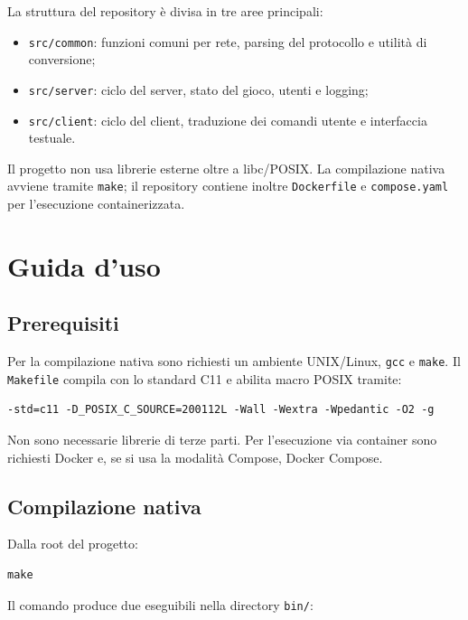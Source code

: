 \documentclass[11pt,a4paper]{article}
\begin{document}
La struttura del repository è divisa in tre aree principali:

\begin{itemize}
    \item \texttt{src/common}: funzioni comuni per rete, parsing del protocollo
    e utilità di conversione;
    \item \texttt{src/server}: ciclo del server, stato del gioco, utenti e
    logging;
    \item \texttt{src/client}: ciclo del client, traduzione dei comandi utente e
    interfaccia testuale.
\end{itemize}

Il progetto non usa librerie esterne oltre a libc/POSIX. La compilazione nativa
avviene tramite \texttt{make}; il repository contiene inoltre \texttt{Dockerfile}
e \texttt{compose.yaml} per l'esecuzione containerizzata.

\section{Guida d'uso}

\subsection{Prerequisiti}

Per la compilazione nativa sono richiesti un ambiente UNIX/Linux, \texttt{gcc} e
\texttt{make}. Il \texttt{Makefile} compila con lo standard C11 e abilita macro
POSIX tramite:

\begin{lstlisting}[style=textstyle]
-std=c11 -D_POSIX_C_SOURCE=200112L -Wall -Wextra -Wpedantic -O2 -g
\end{lstlisting}

Non sono necessarie librerie di terze parti. Per l'esecuzione via container sono
richiesti Docker e, se si usa la modalità Compose, Docker Compose.

\subsection{Compilazione nativa}

Dalla root del progetto:

\begin{lstlisting}[style=textstyle]
make
\end{lstlisting}

Il comando produce due eseguibili nella directory \texttt{bin/}:
\end{document}
